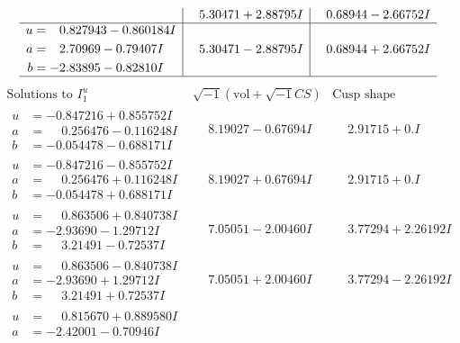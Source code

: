 \documentclass[1p]{elsarticle_modified}
\theoremstyle{definition}
\newcommand{\I}{\sqrt{-1}}
\begin{document}
$$\begin{array}{c|c|c}
 & \phantom{-}5.30471 + 2.88795 I & \phantom{-}0.68944 - 2.66752 I \\ \hline\begin{aligned}
u &= \phantom{-}0.827943 - 0.860184 I \\
a &= \phantom{-}2.70969 - 0.79407 I \\
b &= -2.83895 - 0.82810 I\end{aligned}
 & \phantom{-}5.30471 - 2.88795 I & \phantom{-}0.68944 + 2.66752 I\\
 \hline 
 \end{array}$$\newpage$$\begin{array}{c|c|c}  
\text{Solutions to }I^u_{1}& \I (\text{vol} + \sqrt{-1}CS) & \text{Cusp shape}\\
 \hline 
\begin{aligned}
u &= -0.847216 + 0.855752 I \\
a &= \phantom{-}0.256476 - 0.116248 I \\
b &= -0.054478 - 0.688171 I\end{aligned}
 & \phantom{-}8.19027 - 0.67694 I & \phantom{-}2.91715 + 0. I\phantom{ +0.000000I} \\ \hline\begin{aligned}
u &= -0.847216 - 0.855752 I \\
a &= \phantom{-}0.256476 + 0.116248 I \\
b &= -0.054478 + 0.688171 I\end{aligned}
 & \phantom{-}8.19027 + 0.67694 I & \phantom{-}2.91715 + 0. I\phantom{ +0.000000I} \\ \hline\begin{aligned}
u &= \phantom{-}0.863506 + 0.840738 I \\
a &= -2.93690 - 1.29712 I \\
b &= \phantom{-}3.21491 - 0.72537 I\end{aligned}
 & \phantom{-}7.05051 - 2.00460 I & \phantom{-}3.77294 + 2.26192 I \\ \hline\begin{aligned}
u &= \phantom{-}0.863506 - 0.840738 I \\
a &= -2.93690 + 1.29712 I \\
b &= \phantom{-}3.21491 + 0.72537 I\end{aligned}
 & \phantom{-}7.05051 + 2.00460 I & \phantom{-}3.77294 - 2.26192 I \\ \hline\begin{aligned}
u &= \phantom{-}0.815670 + 0.889580 I \\
a &= -2.42001 - 0.70946 I \\

\end{aligned}
\end{array}$$
\end{document}
